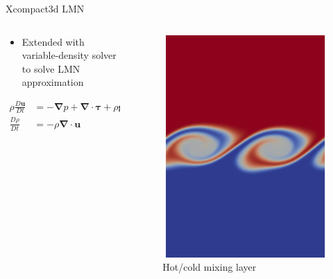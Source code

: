 \documentclass[presentation]{beamer}
\begin{document}
\begin{frame}[label={sec:orgfc15911}]{Xcompact3d LMN}
\begin{columns}
\begin{column}{0.5\columnwidth}
\begin{itemize}
\item Extended with variable-density solver to solve LMN approximation \cite{Bartholomew2019}
\end{itemize}
\begin{align*}
  \rho \frac{D\boldsymbol{u}}{Dt} &= -\boldsymbol{\nabla} p +
                                    \boldsymbol{\nabla}\cdot\boldsymbol{\tau} + \rho\boldsymbol{g}
  \\
  \frac{D\rho}{Dt} &= -\rho\boldsymbol{\nabla}\cdot\boldsymbol{u}
\end{align*}
\end{column}

\begin{column}{0.5\columnwidth}
\begin{figure}[htbp]
\centering
\includegraphics[width=0.7\columnwidth]{./figures/mixlayer.png}
\caption{Hot/cold mixing layer}
\end{figure}
\end{column}
\end{columns}
\end{frame}
\end{document}
